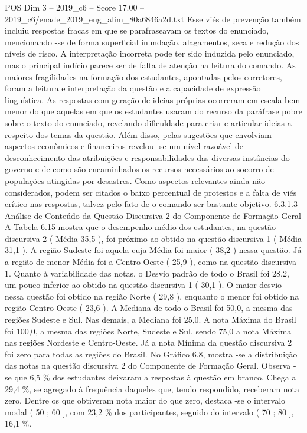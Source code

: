 \begin{textsample}{POS Dim 3 – 2019\_c6 – Score 17.00 – 2019\_c6/enade\_2019\_eng\_alim\_80a6846a2d.txt}
Esse viés de prevenção também incluiu respostas fracas em que se parafraseavam os textos do enunciado, mencionando -se de forma superficial inundação, alagamentos, seca e redução dos níveis de risco.
A interpretação incorreta pode ter sido induzida pelo enunciado, mas o principal indício parece ser de falta de atenção na leitura do comando.
As maiores fragilidades na formação dos estudantes, apontadas pelos corretores, foram a leitura e interpretação da questão e a capacidade de expressão linguística.
As respostas com geração de ideias próprias ocorreram em escala bem menor do que aquelas em que os estudantes usaram do recurso da paráfrase pobre sobre o texto do enunciado, revelando dificuldade para criar e articular ideias a respeito dos temas da questão.
Além disso, pelas sugestões que envolviam aspectos econômicos e financeiros revelou -se um nível razoável de desconhecimento das atribuições e responsabilidades das diversas instâncias do governo e de como são encaminhados os recursos necessários ao socorro de populações atingidas por desastres.
Como aspectos relevantes ainda não considerados, podem ser citados o baixo percentual de protestos e a falta de viés crítico nas respostas, talvez pelo fato de o comando ser bastante objetivo. 6.3.1.3 Análise de Conteúdo da Questão Discursiva 2 do Componente de Formação Geral A Tabela 6.15 mostra que o desempenho médio dos estudantes, na questão discursiva 2 ( Média 35,5 ), foi próximo ao obtido na questão discursiva 1 ( Média 31,1 ).
A região Sudeste foi aquela cuja Média foi maior ( 38,2 ) nessa questão.
Já a região de menor Média foi a Centro-Oeste ( 25,9 ), como na questão discursiva 1.
Quanto à variabilidade das notas, o Desvio padrão de todo o Brasil foi 28,2, um pouco inferior ao obtido na questão discursiva 1 ( 30,1 ).
O maior desvio nessa questão foi obtido na região Norte ( 29,8 ), enquanto o menor foi obtido na região Centro-Oeste ( 23,6 ).
A Mediana de todo o Brasil foi 50,0, a mesma das regiões Sudeste e Sul.
Nas demais, a Mediana foi 25,0.
A nota Máxima do Brasil foi 100,0, a mesma das regiões Norte, Sudeste e Sul, sendo 75,0 a nota Máxima nas regiões Nordeste e Centro-Oeste.
Já a nota Mínima da questão discursiva 2 foi zero para todas as regiões do Brasil.
No Gráfico 6.8, mostra -se a distribuição das notas na questão discursiva 2 do Componente de Formação Geral.
Observa -se que 6,5 \% dos estudantes deixaram a respostas à questão em branco.
Chega a 29,4 \%, se agregado à frequência daqueles que, tendo respondido, receberam nota zero.
Dentre os que obtiveram nota maior do que zero, destaca -se o intervalo modal ( 50 ; 60 ], com 23,2 \% dos participantes, seguido do intervalo ( 70 ; 80 ], 16,1 \%.

\end{textsample}
